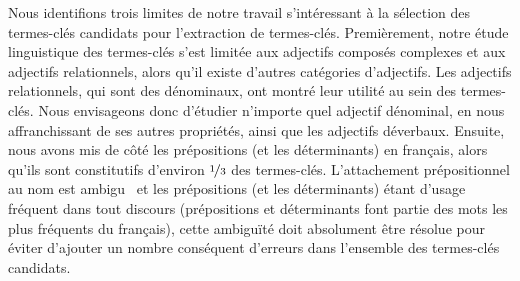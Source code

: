     Nous identifions trois limites de notre travail s'intéressant à la sélection
    des termes-clés candidats pour l'extraction de termes-clés. Premièrement,
    notre étude linguistique des termes-clés s'est limitée aux adjectifs
    composés complexes et aux adjectifs relationnels, alors qu'il existe
    d'autres catégories d'adjectifs. Les adjectifs relationnels, qui sont des
    dénominaux, ont montré leur utilité au sein des termes-clés. Nous
    envisageons donc d'étudier n'importe quel adjectif dénominal, en nous
    affranchissant de ses autres propriétés, ainsi que les adjectifs déverbaux.
    Ensuite, nous avons mis de côté les prépositions (et les déterminants) en
    français, alors qu'ils sont constitutifs d'environ $\unitfrac{1}{3}$ des
    termes-clés. L'attachement prépositionnel au nom est
    ambigu~\cite{colonna2002ambiguitesyntaxique} et les prépositions (et les
    déterminants) étant d'usage fréquent dans tout discours (prépositions et
    déterminants font partie des mots les plus fréquents du français), cette
    ambiguïté doit absolument être résolue pour éviter d'ajouter un nombre
    conséquent d'erreurs dans l'ensemble des termes-clés candidats.

